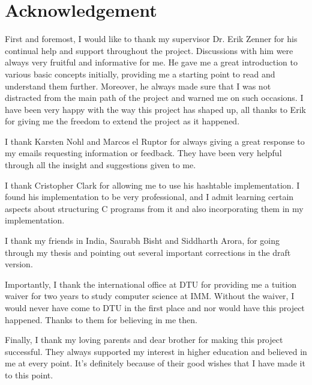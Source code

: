 
\chapter*{Acknowledgement}

First and foremost, I would like to thank my supervisor Dr. Erik Zenner for his continual help and support throughout the project. Discussions with him were always very fruitful and informative for me. He gave me a great introduction to various basic concepts initially, providing me a starting point to read and understand them further. Moreover, he always made sure that I was not distracted from the main path of the project and warned me on such occasions. I have been very happy with the way this project has shaped up, all thanks to Erik for giving me the freedom to extend the project as it happened. 

I thank Karsten Nohl and Marcos el Ruptor for always giving a great response to my emails requesting information or feedback. They have been very helpful through all the insight and suggestions given to me. 

I thank Cristopher Clark for allowing me to use his hashtable implementation. I found his implementation to be very professional, and I admit learning certain aspects about structuring C programs from it and also incorporating them in my implementation. 

I thank my friends in India, Saurabh Bisht and Siddharth Arora, for going through my thesis and pointing out several important corrections in the draft version.

Importantly, I thank the international office at DTU for providing me a tuition waiver for two years to study computer science at IMM. Without the waiver, I would never have come to DTU in the first place and nor would have this project happened. Thanks to them for believing in me then.

Finally, I thank my loving parents and dear brother for making this project successful. They always supported my interest in higher education and believed in me at every point. It's definitely because of their good wishes that I have made it to this point. 